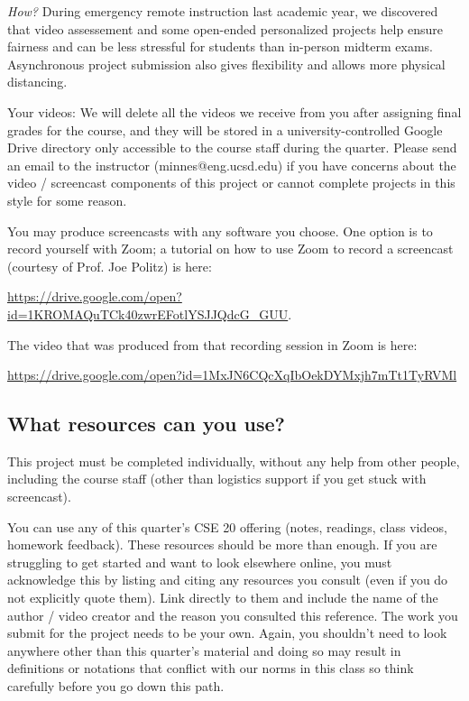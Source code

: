 \documentclass[12pt, oneside]{article}
\begin{document}
{\it How?} During emergency remote instruction last academic year, we discovered
that video assessement and some open-ended personalized projects help ensure fairness
and can be less stressful for students than in-person midterm exams. Asynchronous project
submission also gives flexibility and allows more physical distancing.

Your videos: We will delete all the videos we receive from you after assigning final grades for the course, 
and they will be stored in a university-controlled Google Drive directory 
only accessible to the course staff during the quarter. 
Please send an email to the instructor (minnes@eng.ucsd.edu) if you have 
concerns about 
the video / screencast components of this project or cannot complete projects in this style for some reason.

You may produce screencasts with any software you choose. 
One option is to record yourself with Zoom; a tutorial on how to use Zoom to record a 
screencast (courtesy of Prof. Joe Politz)  is here: 

\url{https://drive.google.com/open?id=1KROMAQuTCk40zwrEFotlYSJJQdcG_GUU}.

The video that was produced from that recording session in Zoom is here:

\url{https://drive.google.com/open?id=1MxJN6CQcXqIbOekDYMxjh7mTt1TyRVMl}

\subsection*{What resources can you use?}
This project must be completed individually, without any help from other people, 
including the course staff (other than logistics support if you get stuck with screencast). 

You can use any of this quarter's CSE 20 offering (notes, readings, class videos, homework feedback). 
These resources should be more than enough. If you are struggling to get started and want to 
look elsewhere online, you must acknowledge this by listing and citing any resources you consult 
(even if you do not explicitly quote them). Link directly to them and include the name of the 
author / video creator and the reason you consulted this reference. The work you submit for 
the project needs to be your own. Again, you shouldn't need to look anywhere other 
than this quarter's material and doing so may result in definitions or notations 
that conflict with our norms in this class so think carefully before you go down this path.
\end{document}
